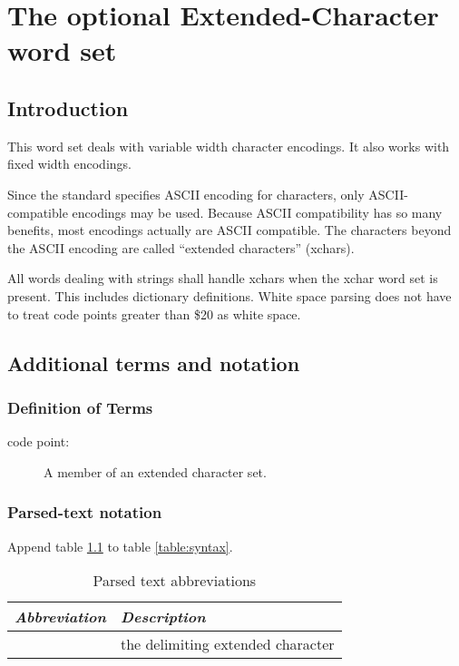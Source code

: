 
\chapter{The optional Extended-Character word set} %

\section{Introduction} %
\label{xchar:intro}

This word set deals with variable width character encodings.  It also
works with fixed width encodings.

Since the standard specifies ASCII encoding for characters, only
ASCII-compatible encodings may be used.  Because ASCII compatibility
has so many benefits, most encodings actually are ASCII compatible.
The characters beyond the ASCII encoding are called ``extended
characters'' (xchars).

All words dealing with strings shall handle xchars when the xchar word
set is present.  This includes dictionary definitions.  White space
parsing does not have to treat code points greater than \$20 as white
space.

\section{Additional terms and notation} %

\subsection{Definition of Terms} %

\begin{description}
\item[code point:] A member of an extended character set.
\end{description}

\subsection{Parsed-text notation}

Append table \ref{xchar:syntax} to table \ref{table:syntax}.

\begin{table}[ht]
	\begin{center}
		\caption{Parsed text abbreviations}
		\label{xchar:syntax}
		\begin{tabular}{ll}
		\hline\hline
			\emph{Abbreviation} & \emph{Description} \\ \hline
			\param{<xchar>} & the delimiting extended character \\
		\hline\hline
		\end{tabular}
	\end{center}
\end{table}

